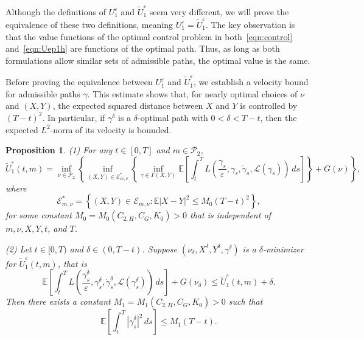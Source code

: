 \documentclass[reqno,11pt]{amsart}
\newtheorem{proposition}[theorem]{Proposition}
\numberwithin{equation}{section}
\newcommand{\e}{\varepsilon}
\newcommand{\ep}{\varepsilon}
\newcommand{\nd}{\noindent}
\renewcommand{\hat}{\widehat}
\begin{document}
\nd
Although the definitions of $U^\varepsilon_1$ and $\tilde{U}^\varepsilon_1$ seem very different, we will prove the equivalence of these two definitions, meaning $U^\e_1=\tilde{U}^\e_1$. The key observation is that the value functions of the optimal control problem in both~\eqref{eqn:control} and~\eqref{eqn:Uep1h} {are functions} of the optimal path. Thus, as long as both formulations allow similar sets of admissible paths, the optimal value is the same.
\vspace{1mm}

\nd
Before proving the equivalence between $U^\e_1$ and $\tilde{U}^\e_1$, we establish a velocity bound for admissible paths $\gamma$. This estimate shows that, for nearly optimal choices of $\nu$ and $(X,Y)$, the expected squared distance between $X$ and $Y$ is controlled by $(T-t)^2$. In particular, if $\gamma^\delta$ is a $\delta$-optimal path with $0<\delta<T-t$, then the expected $L^2$-norm of its velocity is bounded.
\begin{proposition}\label{prop:Uepm2new}
(1) For any $t \in [0, T]$ and $m\in \mathcal{P}_2$,
\begin{equation}\label{eqn:Uep1hnew}
\tilde{U}_1^\e(t,m)
= \inf_{\nu \in \mathcal{P}_2} \left\{ \inf_{(X, Y) \in \mathcal{E}^\ast_{m,\nu}} \left\{ \inf_{\gamma \in \Gamma(X, Y)} \mathbb{E}\left[\int_{t}^T L\left( \frac{\gamma_s}{\e}, \gamma_s, \dot{\gamma}_s, \mathcal{L}(\gamma_s) \right)\, ds \right] \right\}+G(\nu) \right\},
\end{equation}
where
\begin{equation}\label{eqn:estar}
\mathcal{E}^\ast_{m,\nu}=\left\{(X, Y) \in \mathcal{E}_{m,\nu}: \mathbb{E}\left|X-Y\right|^2 \leq M_0 (T-t)^2\right\},
\end{equation}
for some constant $M_0=M_0(C_{2,H}, C_G, K_0)>0$ that is independent of $m, \nu, X,Y, t$, and $T$.


\noindent
(2) Let $t \in [0, T)$ and $\delta \in \left(0, T-t\right)$. Suppose $(\nu_\delta,X^\delta, Y^\delta,\gamma^\delta)$ is a $\delta$-minimizer for $\tilde{U}^\e_1(t,m)$, that is
\begin{equation}\label{eqn:U1opdel}
\mathbb{E}\left[
\int_{t}^T
L\left(
\frac{\gamma^\delta_s}{\e},
\gamma^\delta_s,
\dot{\gamma}^\delta_s,
\mathcal{L}(\gamma^\delta_s)
\right)\, ds
\right] +G(\nu_\delta) \leq \tilde{U}_1^\ep(t, m)+\delta.
\end{equation}
Then there exists a constant $M_1=M_1(C_{2, H}, C_G, K_0)>0$ such that
\[
\mathbb{E}\left[\int_{t}^T|\dot{\gamma}^\delta_s|^2 \,ds\right] \leq M_1(T-t).
\]
\end{proposition}
\end{document}
